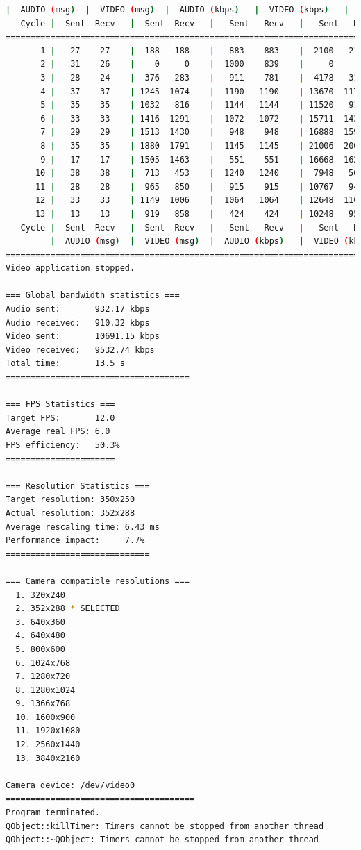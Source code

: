 \begin{lstlisting}[language=bash,basicstyle=\ttfamily\tiny]
         |  AUDIO (msg)  |  VIDEO (msg)  |  AUDIO (kbps)   |  VIDEO (kbps)   |     CPU (%) 
   Cycle |  Sent  Recv   |  Sent  Recv   |   Sent   Recv   |   Sent   Recv   | Program System
================================================================================================
       1 |   27    27    |  188   188    |   883    883    |  2100   2100    |  22    100       
       2 |   31    26    |    0     0    |  1000    839    |     0      0    |  41     77       
       3 |   28    24    |  376   283    |   911    781    |  4178   3146    |  35     74       
       4 |   37    37    | 1245  1074    |  1190   1190    | 13670  11791    |  40     70       
       5 |   35    35    | 1032   816    |  1144   1144    | 11520   9110    |  43     66       
       6 |   33    33    | 1416  1291    |  1072   1072    | 15711  14323    |  40     71       
       7 |   29    29    | 1513  1430    |   948    948    | 16888  15963    |  31     68       
       8 |   35    35    | 1880  1791    |  1145   1145    | 21006  20013    |  46     71       
       9 |   17    17    | 1505  1463    |   551    551    | 16668  16205    |  39     70       
      10 |   38    38    |  713   453    |  1240   1240    |  7948   5049    |  46     61       
      11 |   28    28    |  965   850    |   915    915    | 10767   9485    |  36     67       
      12 |   33    33    | 1149  1006    |  1064   1064    | 12648  11072    |  36     72       
      13 |   13    13    |  919   858    |   424    424    | 10248   9567    |  17     70       
   Cycle |  Sent  Recv   |  Sent  Recv   |   Sent   Recv   |   Sent   Recv   | Program System
         |  AUDIO (msg)  |  VIDEO (msg)  |  AUDIO (kbps)   |  VIDEO (kbps)   |     CPU (%) 
===========================================================================================
Video application stopped.

=== Global bandwidth statistics ===
Audio sent:       932.17 kbps
Audio received:   910.32 kbps
Video sent:       10691.15 kbps
Video received:   9532.74 kbps
Total time:       13.5 s
=====================================

=== FPS Statistics ===
Target FPS:       12.0
Average real FPS: 6.0
FPS efficiency:   50.3%
======================

=== Resolution Statistics ===
Target resolution: 350x250
Actual resolution: 352x288
Average rescaling time: 6.43 ms
Performance impact:     7.7%
=============================

=== Camera compatible resolutions ===
  1. 320x240
  2. 352x288 * SELECTED
  3. 640x360
  4. 640x480
  5. 800x600
  6. 1024x768
  7. 1280x720
  8. 1280x1024
  9. 1366x768
  10. 1600x900
  11. 1920x1080
  12. 2560x1440
  13. 3840x2160

Camera device: /dev/video0
======================================
Program terminated.
QObject::killTimer: Timers cannot be stopped from another thread
QObject::~QObject: Timers cannot be stopped from another thread
\end{lstlisting}
\vspace{\baselineskip}

